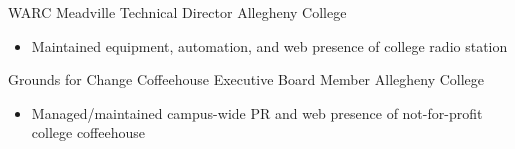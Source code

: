 \documentclass[11pt,letter,sans]{moderncv}
\begin{document}
    {WARC Meadville}%
    {Technical Director}%
    {Allegheny College}%
    {}%
    {
        \begin{itemize}
            \item Maintained equipment, automation, and web
                presence of college radio station
        \end{itemize}
    }

    {Grounds for Change Coffeehouse}%
    {Executive Board Member}%
    {Allegheny College}%
    {}%
    {
        \begin{itemize}
            \item Managed/maintained campus-wide PR and web presence of
                not-for-profit college coffeehouse
        \end{itemize}
    }
\end{document}
